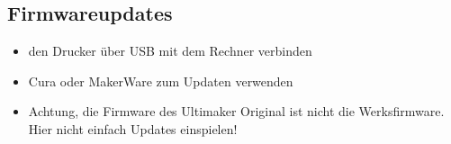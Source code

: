\documentclass{\basedir/fablab-document}
\begin{document}
\subsection{Firmwareupdates}

\begin{itemize}
\item den Drucker über USB mit dem Rechner verbinden
\item Cura oder MakerWare zum Updaten verwenden
\item Achtung, die Firmware des Ultimaker Original ist nicht die Werksfirmware. Hier nicht einfach Updates einspielen! 
\end{itemize}

\end{document}
